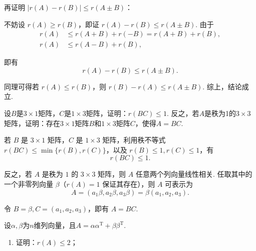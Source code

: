 \begin{exercise}
\begin{exgroup}
\begin{answer}
            再证明 $|r(A) - r(B)| \leqslant r(A \pm B)$：

            不妨设 $r(A) \geqslant r(B)$，即证 $r(A) - r(B) \leqslant r(A \pm B)$. 由于
            \begin{align*}
                r(A) &\leqslant r(A + B) + r(-B) = r(A + B) + r(B), \\
                r(A) &\leqslant r(A - B) + r(B),
            \end{align*}

            即有
            \[
                r(A) - r(B) \leqslant r(A \pm B).
            \]

            同理可得若 $r(A) \leqslant r(B)$，则 $r(B) - r(A) \leqslant r(A \pm B)$. 综上，结论成立.

        \end{answer}

        \item 设$B$是$3 \times 1$矩阵，$C$是$1 \times 3$矩阵，证明：$r(BC) \leqslant 1$. 反之，若$A$是秩为1的$3 \times 3$矩阵，证明：存在$3 \times 1$矩阵$B$和$1 \times 3$矩阵$C$，使得$A = BC$.
        \begin{answer}
            若 $B$ 是 $3 \times 1$ 矩阵，$C$ 是 $1 \times 3$ 矩阵，利用秩不等式 $r(BC) \leqslant \min\{r(B), r(C)\}$，以及 $r(B) \leqslant 1, r(C) \leqslant 1$，有
            \[
                r(BC) \leqslant 1.
            \]

            反之，若 $A$ 是秩为 $1$ 的 $3 \times 3$ 矩阵，则 $A$ 任意两个列向量线性相关. 任取其中的一个非零列向量 $\beta$（$r(A)=1$ 保证其存在），则 $A$ 可表示为
            \[
                A = (a_1 \beta, a_2 \beta, a_3 \beta) = \beta (a_1 , a_2 , a_3).
            \]

            令 $B = \beta, C = (a_1 , a_2 , a_3)$，即有 $A = BC$.

        \end{answer}

        \item 设$\alpha,\beta$为$n$维列向量，且$A=\alpha\alpha^\mathrm{T}+\beta\beta^\mathrm{T}$.
        \begin{enumerate}
            \item 证明：$r(A) \leqslant 2$；


\end{enumerate}
\end{exgroup}
\end{exercise}

